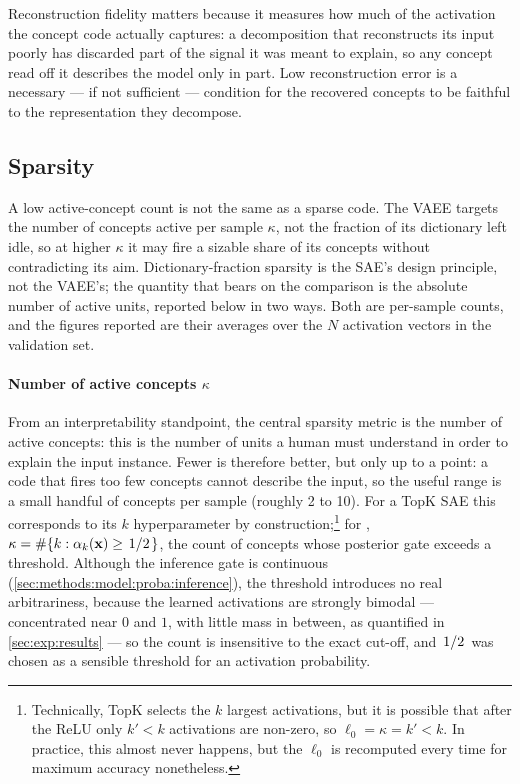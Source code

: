 Reconstruction fidelity matters because it measures how much of the activation
the concept code actually captures: a decomposition that reconstructs its input
poorly has discarded part of the signal it was meant to explain, so any concept
read off it describes the model only in part. Low reconstruction error is a
necessary --- if not sufficient --- condition for the recovered concepts to be
faithful to the representation they decompose.

\subsection{Sparsity}

    A low active-concept count is not the same as a sparse code. The \ac{VAEE}
    targets the number of concepts active per sample $\kappa$, not the fraction
    of its dictionary left idle, so at higher $\kappa$ it may fire a sizable
    share of its concepts without contradicting its aim. Dictionary-fraction
    sparsity is the \ac{SAE}'s design principle, not the \ac{VAEE}'s; the
    quantity that bears on the comparison is the absolute number of active
    units, reported below in two ways. Both are per-sample counts, and the
    figures reported are their averages over the $N$ activation vectors in the
    validation set.

    \paragraph{Number of active concepts $\kappa$} From an interpretability
    standpoint, the central sparsity metric is the number of active concepts:
    this is the number of units a human must understand in order to explain the
    input instance. Fewer is therefore better, but only up to a point: a code
    that fires too few concepts cannot describe the input, so the useful range is
    a small handful of concepts per sample (roughly 2 to 10). For a TopK
    \ac{SAE} this corresponds to its $k$
    hyperparameter by
    construction;\footnote{\label{fn:exp:metrics:topk}Technically,
        TopK selects the $k$ largest activations, but it is possible that after
        the ReLU only $k' < k$ activations are non-zero, so $\ell_{0} = \kappa =
        k' < k$. In practice, this almost never happens, but the $\ell_{0}$ is
    recomputed every time for maximum accuracy nonetheless.} for ,
    $\kappa = \#\{k : \alpha_k(\vb{x}) \ge \flatfrac{1}{2}\}$, the count of
    concepts whose posterior gate exceeds a threshold. Although the inference
    gate is continuous
    (\cref{sec:methods:model:proba:inference}),
    the threshold introduces no real arbitrariness, because the learned
    activations are strongly bimodal --- concentrated near $0$ and $1$, with
    little mass in between, as quantified in \cref{sec:exp:results}
    --- so the count is insensitive to the exact
    cut-off, and $\flatfrac{1}{2}$ was chosen as a sensible threshold for an
    activation probability.

